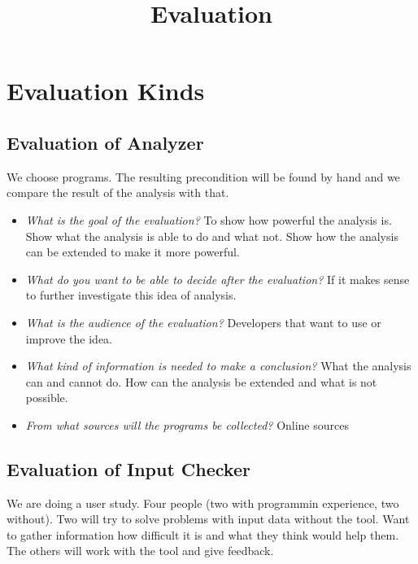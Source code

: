 \documentclass[11pt]{article}
\begin{document}
\title{Evaluation}

\maketitle


\section{Evaluation Kinds}

\subsection{Evaluation of Analyzer}

We choose programs. The resulting precondition will be found by hand and we compare the result of the analysis with that.

\begin{itemize}
  \item \textit{What is the goal of the evaluation?} To show how powerful the analysis is. Show what the analysis is able to do and what not. Show how the analysis can be extended to make it more powerful.
  \item \textit{What do you want to be able to decide after the evaluation?} If it makes sense to further investigate this idea of analysis.
  \item \textit{What is the audience of the evaluation?} Developers that want to use or improve the idea.
  \item \textit{What kind of information is needed to make a conclusion?} What the analysis can and cannot do. How can the analysis be extended and what is not possible.
  \item \textit{From what sources will the programs be collected?} Online sources
\end{itemize}

\subsection{Evaluation of Input Checker}

We are doing a user study. Four people (two with programmin experience, two without). Two will try to solve problems with input data without the tool. Want to gather information how difficult it is and what they think would help them. The others will work with the tool and give feedback.
\end{document}
